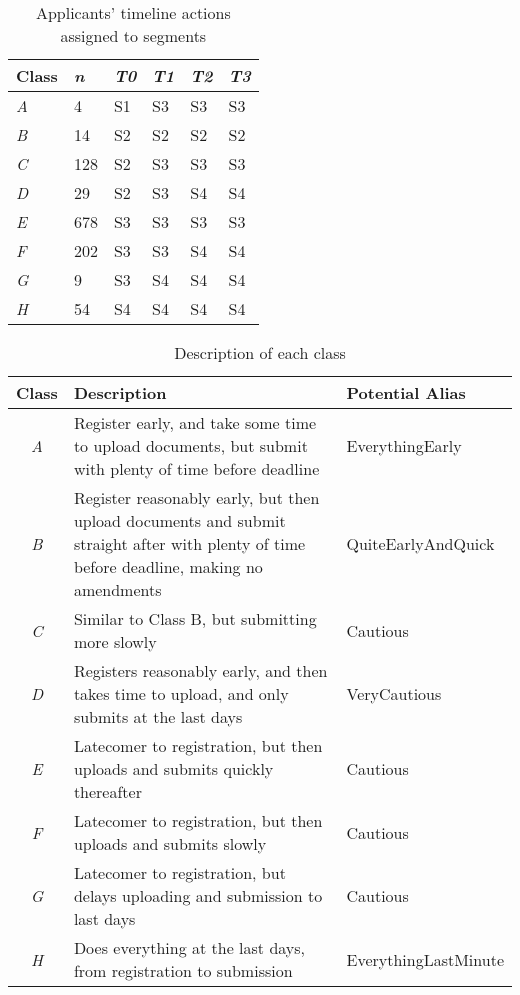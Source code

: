 \documentclass[letterpaper]{article}
\begin{document}
\begin{table}[!ht]
\centering
\begin{tabularx}{\columnwidth}{Y Y Y Y Y Y}
\hline
Class & {\emph{n}} & {\emph{T0}} & {\emph{T1}} & {\emph{T2}} & {\emph{T3}} \\ 
\hline
{\emph{A}} & 4 & S1 & S3 & S3 & S3\\
{\emph{B}} & 14 & S2 & S2 & S2 & S2\\
{\emph{C}} & 128 & S2 & S3 & S3 & S3\\
{\emph{D}} & 29 & S2 & S3 & S4 & S4\\
{\emph{E}} & 678 & S3 & S3 & S3 & S3\\
{\emph{F}} & 202 & S3 & S3 & S4 & S4\\
{\emph{G}} & 9 & S3 & S4 & S4 & S4\\
{\emph{H}} & 54 & S4 & S4 & S4 & S4\\
\hline
\end{tabularx}
\caption{Applicants' timeline actions assigned to segments}
\label{tbl:apptlseg}
\end{table}

\begin{table*}[!ht]
\centering
\begin{tabularx}{\textwidth}{c X l}
\hline
Class & Description & Potential Alias  \\ 
\hline
{\emph{A}} & Register early, and take some time to upload documents, but submit with plenty of time before deadline & EverythingEarly\\
{\emph{B}} & Register reasonably early, but then upload documents and submit straight after with plenty of time before deadline, making no amendments & QuiteEarlyAndQuick\\
{\emph{C}} & Similar to Class B, but submitting more slowly & Cautious\\
{\emph{D}} & Registers reasonably early, and then takes time to upload, and only submits at the last days & VeryCautious\\
{\emph{E}} & Latecomer to registration, but then uploads and submits
quickly thereafter & Cautious\\
{\emph{F}} & Latecomer to registration, but then uploads and submits
slowly & Cautious\\
{\emph{G}} & Latecomer to registration, but delays uploading and
submission to last days & Cautious\\
{\emph{H}} & Does everything at the last days, from registration to submission & EverythingLastMinute\\
\hline
\end{tabularx}
\caption{Description of each class}
\label{tbl:classdesc}
\end{table*}
\end{document}
